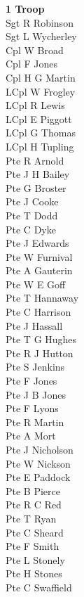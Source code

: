 \begin{multicols}{3}
  \small
  \noindent
  \textbf{1 Troop} \\
  Sgt R Robinson \\
  Sgt L Wycherley \\
  Cpl W Broad \\
  Cpl F Jones \\
  Cpl H G Martin \\
  LCpl W Frogley \\
  LCpl R Lewis \\
  LCpl E Piggott \\
  LCpl G Thomas \\
  LCpl H Tupling \\
  Pte R Arnold \\
  Pte J H Bailey \\
  Pte G Broster \\
  Pte J Cooke \\
  Pte T Dodd \\
  Pte C Dyke \\
  Pte J Edwards \\
  Pte W Furnival \\
  Pte A Gauterin \\
  Pte W E Goff \\
  Pte T Hannaway \\
  Pte C Harrison \\
  Pte J Hassall \\
  Pte T G Hughes \\
  Pte R J Hutton \\
  Pte S Jenkins \\
  Pte F Jones \\
  Pte J B Jones \\
  Pte F Lyons \\
  Pte R Martin \\
  Pte A Mort \\
  Pte J Nicholson \\
  Pte W Nickson \\
  Pte E Paddock \\
  Pte B Pierce \\
  Pte R C Red \\
  Pte T Ryan \\
  Pte C Sheard \\
  Pte F Smith \\
  Pte L Stonely \\
  Pte H Stones \\
  Pte C Swaffield \\

\end{multicols}
